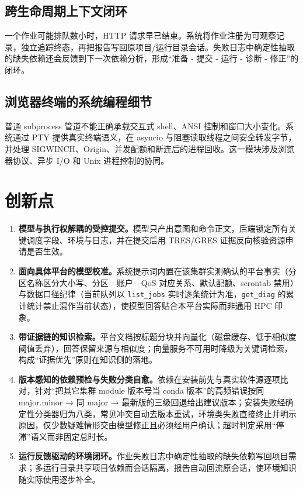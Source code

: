 \documentclass[UTF8,11pt,a4paper]{ctexart}
\newcommand{\code}[1]{\texttt{\small #1}}
\begin{document}
\subsection{跨生命周期上下文闭环}
一个作业可能排队数小时，HTTP 请求早已结束。系统将作业注册为可观察记录，独立追踪终态，再把报告写回原项目/运行目录会话。失败日志中确定性抽取的缺失依赖还会反馈到下一次依赖分析，形成“准备 - 提交 - 运行 - 诊断 - 修正”的闭环。

\subsection{浏览器终端的系统编程细节}
普通 subprocess 管道不能正确承载交互式 shell、ANSI 控制和窗口大小变化。系统通过 PTY 提供真实终端语义，在 asyncio 与阻塞读取线程之间安全转发字节，并处理 SIGWINCH、Origin、并发配额和断连后的进程回收。这一模块涉及浏览器协议、异步 I/O 和 Unix 进程控制的协同。

\section{创新点}

\begin{enumerate}
  \item \textbf{模型与执行权解耦的受控提交。}模型只产出意图和命令正文，后端锁定所有关键调度字段、环境与日志，并在提交后用 TRES/GRES 证据反向核验资源申请是否生效。
  \item \textbf{面向具体平台的模型校准。}系统提示词内置在该集群实测确认的平台事实（分区名称区分大小写、分区—账户—QoS 对应关系、默认配额、scrontab 禁用）与数据口径纪律（当前队列以 \code{list\_jobs} 实时逐条统计为准，\code{get\_diag} 的累计统计禁止混作当前状态），使模型回答贴合本平台实际而非通用 HPC 印象。
  \item \textbf{带证据链的知识检索。}平台文档按标题分块并向量化（磁盘缓存、低于相似度阈值丢弃），回答保留来源与相似度；向量服务不可用时降级为关键词检索，构成“证据优先”原则在知识侧的落地。
  \item \textbf{版本感知的依赖预检与失败分类自愈。}依赖在安装前先与真实软件源逐项比对，针对“把其它集群 module 版本号当 conda 版本”的高频错误按同 major.minor → 同 major → 最新版的三级回退给出建议版本；安装失败经确定性分类器归为八类，常见冲突自动去版本重试，环境类失败直接终止并明示原因，仅少数疑难情形交由模型修正且必须经用户确认；超时判定采用“停滞”语义而非固定总时长。
  \item \textbf{运行反馈驱动的环境闭环。}作业失败日志中确定性抽取的缺失依赖写回项目需求；多运行目录共享项目依赖而会话隔离，报告自动回流原会话，使环境知识随实际使用逐步补全。
\end{enumerate}
\end{document}
